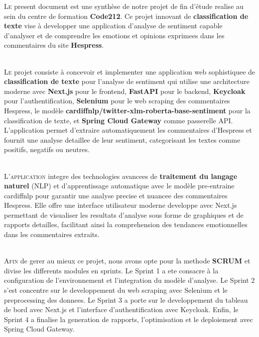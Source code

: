 
\lettrine[nindent=0em, slope=.5em] {\color{Eblue}L}{e} present document est une synthèse de notre projet de fin d'étude realise au sein du centre de formation \textbf{Code212}. Ce projet innovant de \textbf{classification de texte} vise à developper une application d'analyse de sentiment capable d'analyser et de comprendre les emotions et opinions exprimees dans les commentaires du site \textbf{Hespress}.

\ \\

\lettrine[nindent=0em, slope=.5em] {\color{Eblue}L}{e} projet consiste à concevoir et implementer une application web sophistiquee de \textbf{classification de texte} pour l'analyse de sentiment qui utilise une architecture moderne avec \textbf{Next.js} pour le frontend, \textbf{FastAPI} pour le backend, \textbf{Keycloak} pour l'authentification, \textbf{Selenium} pour le web scraping des commentaires Hespress, le modèle \textbf{cardiffnlp/twitter-xlm-roberta-base-sentiment} pour la classification de texte, et \textbf{Spring Cloud Gateway} comme passerelle API. L'application permet d'extraire automatiquement les commentaires d'Hespress et fournit une analyse detaillee de leur sentiment, categorisant les textes comme positifs, negatifs ou neutres.

\ \\

\lettrine[nindent=0em, slope=.5em] {\color{Eblue}L}{'application} integre des technologies avancees de \textbf{traitement du langage naturel} (NLP) et d'apprentissage automatique avec le modèle pre-entraine cardiffnlp pour garantir une analyse precise et nuancee des commentaires Hespress. Elle offre une interface utilisateur moderne developpe avec Next.js permettant de visualiser les resultats d'analyse sous forme de graphiques et de rapports detailles, facilitant ainsi la comprehension des tendances emotionnelles dans les commentaires extraits.

\ \\

\lettrine[nindent=0em, slope=.5em] {\color{Eblue}A}{fin} de gerer au mieux ce projet, nous avons opte pour la methode \textbf{SCRUM} et divise les differents modules en sprints. Le Sprint 1 a ete consacre à la configuration de l'environnement et l'integration du modèle d'analyse. Le Sprint 2 s'est concentre sur le developpement du web scraping avec Selenium et le preprocessing des donnees. Le Sprint 3 a porte sur le developpement du tableau de bord avec Next.js et l'interface d'authentification avec Keycloak. Enfin, le Sprint 4 a finalise la generation de rapports, l'optimisation et le deploiement avec Spring Cloud Gateway.

